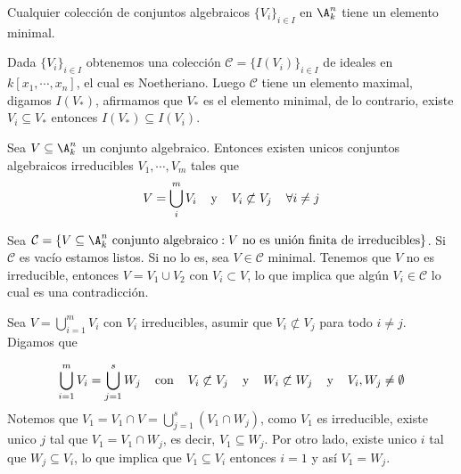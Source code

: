 \documentclass{article}
\begin{document}
\begin{prop}
    Cualquier colección de conjuntos algebraicos $\{V_{i}\}_{i\in I}$ en $\A_{k}^{n}$ tiene un
    elemento minimal.
\end{prop}

\begin{dem}
    Dada $\{V_{i}\}_{i\in I}$ obtenemos una colección $\mathcal{C}=\{I(V_{i})\}_{i\in I}$ de
    ideales en $k[x_{1},\cdots,x_{n}]$, el cual es Noetheriano. Luego $\mathcal{C}$ tiene un 
    elemento maximal, digamos $I(V_{*})$, afirmamos que $V_{*}$ es el elemento minimal, de lo
    contrario, existe $V_{i}\subseteq V_{*}$ entonces $I(V_{*})\subseteq I(V_{i})$.
\end{dem}

\begin{teo}
    Sea $V\subseteq\A_{k}^{n}$ un conjunto algebraico. Entonces existen unicos conjuntos 
    algebraicos irreducibles $V_{1},\cdots,V_{m}$ tales que 
    \begin{equation*}
        V=\bigcup_{i}^{m}V_{i}\hspace{4mm}\text{y}\hspace{4mm}V_{i}\not\subset 
        V_{j}\hspace{4mm}\forall i\neq j
    \end{equation*}   
\end{teo}

\begin{dem}
    Sea $\mathcal{C}=\{V\subseteq\A_{k}^{n}\text{ conjunto algebraico}:V\text
    { no es unión finita de irreducibles}\}$. Si $\mathcal{C}$ es vacío estamos listos. Si no lo 
    es, sea $V\in\mathcal{C}$ minimal. Tenemos que $V$ no es irreducible, entonces 
    $V=V_{1}\cup V_{2}$ con $V_{i}\subset V$, lo que implica que algún $V_{i}\in\mathcal{C}$ lo
    cual es una contradicción.
    \vspace{4mm}

    \noindent Sea $V=\bigcup_{i=1}^{m}V_{i}$ con $V_{i}$ irreducibles, asumir que 
    $V_{i}\not\subset V_{j}$ para todo $i\neq j$. Digamos que
    
    \begin{equation*}
        \bigcup_{i=1}^{m}V_{i}=\bigcup_{j=1}^{s}W_{j}\hspace{4mm}\text{con}\hspace{4mm}
        V_{i}\not\subset V_{j}\hspace{4mm}\text{y}\hspace{4mm} W_{i}\not\subset W_{j}
        \hspace{4mm}\text{y}\hspace{4mm}V_{i},W_{j}\neq\emptyset
    \end{equation*}
    Notemos que $V_{1}=V_{1}\cap V=\bigcup_{j=1}^{s}(V_{1}\cap W_{j})$, como $V_{1}$ es 
    irreducible, existe unico $j$ tal que $V_{1}=V_{1}\cap W_{j}$, es decir, 
    $V_{1}\subseteq W_{j}$. Por otro lado, existe unico $i$ tal que $W_{j}\subseteq V_{i}$, lo que
    implica que $V_{1}\subseteq V_{i}$ entonces $i=1$ y así $V_{1}=W_{j}$.
\end{dem}
\end{document}
